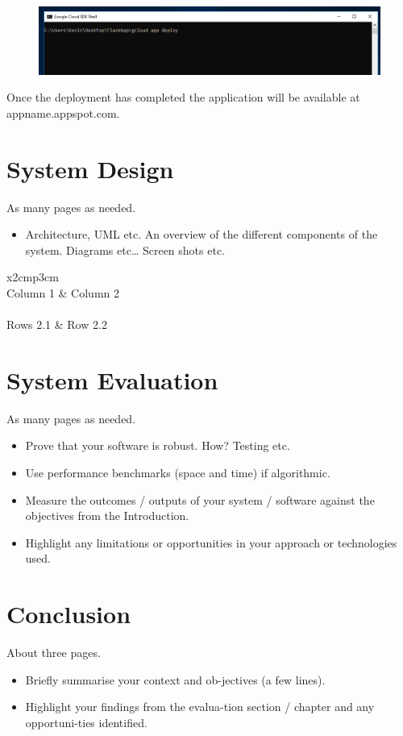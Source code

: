 \begin{figure}[H]
	\centering
	\includegraphics[width=0.7\linewidth]{img/DeployCmd}
	\caption{}
	\label{fig:deploycmd}
\end{figure}
Once the deployment has completed the application will be available at appname.appspot.com. ~\cite{FlaskAppGoolge:online}


\chapter{System Design}
As many pages as needed.
\begin{itemize}
\item Architecture, UML etc. An overview of the different components of the system. Diagrams etc… Screen shots etc.
\end{itemize}

\begin{table}[h]
  \centering
  \begin{tabular}{x{2cm}p{3cm}}
    \toprule \\
    Column 1 & Column 2 \\
    \midrule \\
    Rows 2.1 & Row 2.2 \\
    \bottomrule
  \end{tabular}
  \caption{A table.}
  \label{table:mytable}
\end{table}

\chapter{System Evaluation}
As many pages as needed.
\begin{itemize}
\item Prove that your software is robust. How? Testing etc. 
\item Use performance benchmarks (space and time) if algorithmic.
\item Measure the outcomes / outputs of your system / software against the objectives from the Introduction.
\item Highlight any limitations or opportunities in your approach or technologies used.
\end{itemize}

\chapter{Conclusion}
About three pages.

\begin{itemize}
\item Briefly summarise your context and ob-jectives (a few lines).
\item Highlight your findings from the evalua-tion section / chapter and any opportuni-ties identified.
\end{itemize}

